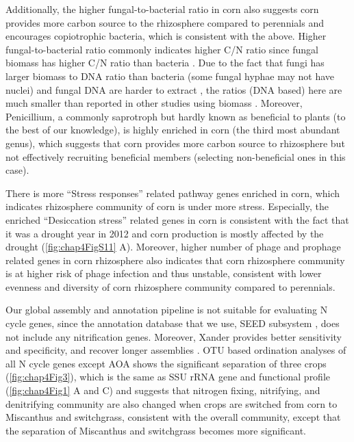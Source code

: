 \documentclass[]{msu-thesis}
\begin{document}
Additionally, the higher fungal-to-bacterial ratio in corn also suggests corn provides more carbon source to the rhizosphere compared to perennials and encourages copiotrophic bacteria, which is consistent with the above. Higher fungal-to-bacterial ratio commonly indicates higher C/N ratio since fungal biomass has higher C/N ratio than bacteria \cite{de_vries_fungal/bacterial_2006,waring_differences_2013}. Due to the fact that fungi has larger biomass to DNA ratio than bacteria (some fungal hyphae may not have nuclei) and fungal DNA are harder to extract \cite{muller_rapid_1998}, the ratios (DNA based) here are much smaller than reported in other studies using biomass \cite{jesus_influence_2015}. Moreover, Penicillium, a commonly saprotroph but hardly known as beneficial to plants (to the best of our knowledge), is highly enriched in corn (the third most abundant genus), which suggests that corn provides more carbon source to rhizosphere but not effectively recruiting beneficial members (selecting non-beneficial ones in this case).

There is more ``Stress responses'' related pathway genes enriched in corn, which indicates rhizosphere community of corn is under more stress. Especially, the enriched ``Desiccation stress'' related genes in corn is consistent with the fact that it was a drought year in 2012 and corn production is mostly affected by the drought (\cref{fig:chap4FigS11} A). Moreover, higher number of phage and prophage related genes in corn rhizosphere also indicates that corn rhizosphere community is at higher risk of phage infection and thus unstable, consistent with lower evenness and diversity of corn rhizosphere community compared to perennials.

Our global assembly and annotation pipeline is not suitable for evaluating N cycle genes, since the annotation database that we use, SEED subsystem \cite{meyer_metagenomics_2008}, does not include any nitrification genes. Moreover, Xander provides better sensitivity and specificity, and recover longer assemblies \cite{wang_xander:_2015}. OTU based ordination analyses of all N cycle genes except AOA shows the significant separation of three crops (\cref{fig:chap4Fig3}), which is the same as SSU rRNA gene and functional profile (\cref{fig:chap4Fig1} A and C) and suggests that nitrogen fixing, nitrifying, and denitrifying community are also changed when crops are switched from corn to Miscanthus and switchgrass, consistent with the overall community, except that the separation of Miscanthus and switchgrass becomes more significant.
\end{document}
